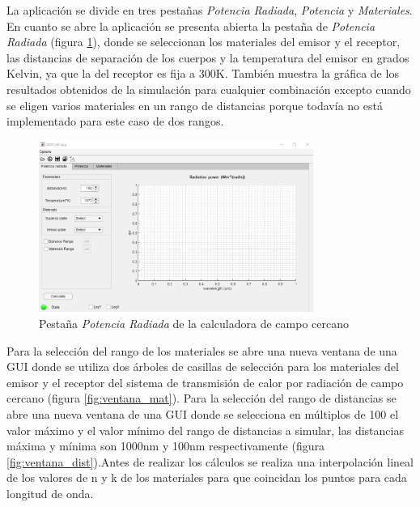 La aplicación se divide en tres pestañas \textit{Potencia Radiada}, \textit{Potencia} y \textit{Materiales}. En cuanto se abre la aplicación se presenta abierta la pestaña de \textit{Potencia Radiada} (figura \ref{fig:pestana_PotenciaRadiada}), donde se seleccionan los materiales del emisor y el receptor, las distancias de separación de los cuerpos y la temperatura del emisor en grados Kelvin, ya que la del receptor es fija a 300K. También muestra la gráfica de los resultados obtenidos de la simulación para cualquier combinación excepto cuando se eligen varios materiales en un rango de distancias porque todavía no está implementado para este caso de dos rangos.\\ 
\begin{figure}[H]
	\centering
		\includegraphics[width=0.80\textwidth]{figuras/pestana_PotenciaRadiada.png}
	\caption{Pestaña \textit{Potencia Radiada} de la calculadora de campo cercano}
	\label{fig:pestana_PotenciaRadiada}
\end{figure}
Para la selección del rango de los materiales se abre una nueva ventana de una GUI donde se utiliza dos árboles de casillas de selección para los materiales del emisor y el receptor del sistema de transmisión de calor por radiación de campo cercano (figura \ref{fig:ventana_mat}). Para la selección del rango de distancias se abre una nueva ventana de una GUI donde se selecciona en múltiplos de 100 el valor máximo y el valor mínimo del rango de distancias a simular, las distancias máxima y mínima son 1000nm y 100nm respectivamente (figura \ref{fig:ventana_dist}).Antes de realizar los cálculos se realiza una interpolación lineal de los valores de n y k de los materiales para que coincidan los puntos para cada longitud de onda.\\\\
